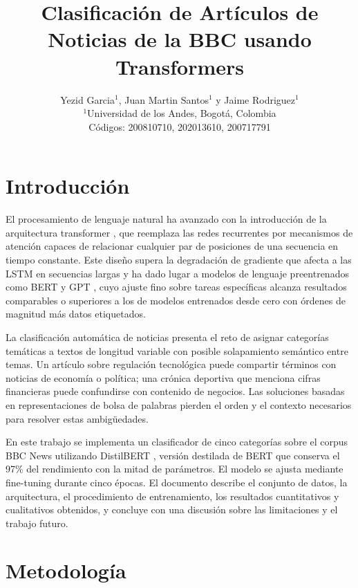 \documentclass[letterpaper, 10 pt, conference]{latex_template/ieeeconf}
\title{\LARGE \bf
Clasificación de Artículos de Noticias de la BBC usando Transformers
}
\author{Yezid Garcia$^{1}$, Juan Martin Santos$^{1}$ y Jaime Rodriguez$^{1}$ \\
{\small $^{1}$Universidad de los Andes, Bogotá, Colombia} \\
{\small Códigos: 200810710, 202013610, 200717791}
}
\begin{document}
\maketitle
\thispagestyle{empty}
\pagestyle{empty}

\section{Introducción}

El procesamiento de lenguaje natural ha avanzado con la introducción de la arquitectura transformer \cite{c1}, que reemplaza las redes recurrentes por mecanismos de atención capaces de relacionar cualquier par de posiciones de una secuencia en tiempo constante. Este diseño supera la degradación de gradiente que afecta a las LSTM en secuencias largas y ha dado lugar a modelos de lenguaje preentrenados como BERT \cite{c2} y GPT \cite{c5}, cuyo ajuste fino sobre tareas específicas alcanza resultados comparables o superiores a los de modelos entrenados desde cero con órdenes de magnitud más datos etiquetados.

La clasificación automática de noticias presenta el reto de asignar categorías temáticas a textos de longitud variable con posible solapamiento semántico entre temas. Un artículo sobre regulación tecnológica puede compartir términos con noticias de economía o política; una crónica deportiva que menciona cifras financieras puede confundirse con contenido de negocios. Las soluciones basadas en representaciones de bolsa de palabras pierden el orden y el contexto necesarios para resolver estas ambigüedades.

En este trabajo se implementa un clasificador de cinco categorías sobre el corpus BBC News \cite{c4} utilizando DistilBERT \cite{c3}, versión destilada de BERT que conserva el 97\% del rendimiento con la mitad de parámetros. El modelo se ajusta mediante fine-tuning durante cinco épocas. El documento describe el conjunto de datos, la arquitectura, el procedimiento de entrenamiento, los resultados cuantitativos y cualitativos obtenidos, y concluye con una discusión sobre las limitaciones y el trabajo futuro.

\section{Metodología}
\end{document}
